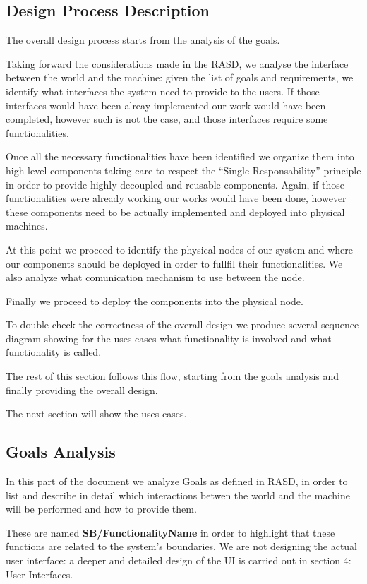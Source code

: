 \documentclass[11pt]{article} %
\begin{document}
\subsection{Design Process Description}

The overall design process starts from the analysis of the goals. 

Taking forward the considerations made in the RASD, we analyse the interface between the world and the machine: given the list of goals and requirements, we identify what interfaces the system need to provide to the users.
If those interfaces would have been alreay implemented our work would have been completed, however such is not the case, and those interfaces require some functionalities.

Once all the necessary functionalities have been identified we organize them into high-level components taking care to respect the ``Single Responsability'' principle in order to provide highly decoupled and reusable components.
Again, if those functionalities were already working our works would have been done, however these components need to be actually implemented and deployed into physical machines.

At this point we proceed to identify the physical nodes of our system and where our components should be deployed in order to fullfil their functionalities. We also analyze what comunication mechanism to use between the node.

Finally we proceed to deploy the components into the physical node.

To double check the correctness of the overall design we produce several sequence diagram showing for the uses cases what functionality is involved and what functionality is called.

The rest of this section follows this flow, starting from the goals analysis and finally providing the overall design.

The next section will show the uses cases.

\subsection{Goals Analysis}

In this part of the document we analyze Goals as defined in RASD, in order to list and describe in detail which interactions betwen the world and the machine will be performed and how to provide them. 

These are named \textbf{SB/FunctionalityName} in order to highlight that these functions are related to the system's boundaries. We are not designing the actual user interface: a deeper and detailed design of the UI is carried out in section 4: User Interfaces.
\end{document}
